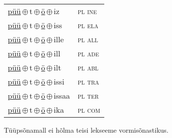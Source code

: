 \begin{minipage}{\textwidth}
\begin{sideways}
\begin{tabular}{l l}
\underline{püü}\,$\oplus$\,t\,$\oplus$\,\underline{ö}\,$\oplus$\,iz & \textsc{ pl ine } \\
\underline{püü}\,$\oplus$\,t\,$\oplus$\,\underline{ö}\,$\oplus$\,iss & \textsc{ pl ela } \\
\underline{püü}\,$\oplus$\,t\,$\oplus$\,\underline{ö}\,$\oplus$\,ille & \textsc{ pl all } \\
\underline{püü}\,$\oplus$\,t\,$\oplus$\,\underline{ö}\,$\oplus$\,ill & \textsc{ pl ade } \\
\underline{püü}\,$\oplus$\,t\,$\oplus$\,\underline{ö}\,$\oplus$\,ilt & \textsc{ pl abl } \\
\underline{püü}\,$\oplus$\,t\,$\oplus$\,\underline{ö}\,$\oplus$\,issi & \textsc{ pl tra } \\
\underline{püü}\,$\oplus$\,t\,$\oplus$\,\underline{ö}\,$\oplus$\,issaa & \textsc{ pl ter } \\
\underline{püü}\,$\oplus$\,t\,$\oplus$\,\underline{ö}\,$\oplus$\,ika & \textsc{ pl com } \\
\end{tabular}
\end{sideways}
\label{tab:tüüpsõnamall-püütö}

\end{minipage}

 
\vspace{1em}
\noindent Tüüpsõnamall  ei hõlma teisi lekseeme vormi\-sõnastikus.
